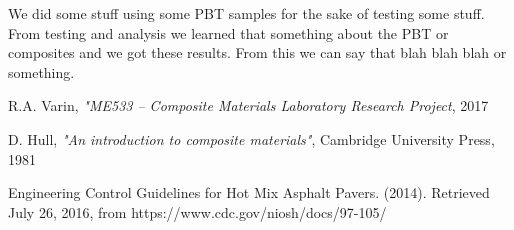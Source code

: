 \documentclass[11pt]{article}
\begin{document}
We did some stuff using some PBT samples for the sake of testing some stuff. From testing and analysis we learned that something about the PBT or composites and we got these results. From this we can say that blah blah blah or something. 

\newpage
\begin{thebibliography}{9}
R.A. Varin, \textit{"ME533 -- Composite Materials Laboratory Research Project}, 2017

D. Hull, \textit{"An introduction to composite materials"}, Cambridge University Press, 1981

Engineering Control Guidelines for Hot Mix Asphalt Pavers. (2014). Retrieved July 26, 2016, from https://www.cdc.gov/niosh/docs/97-105/

\end{thebibliography}
\end{document}
